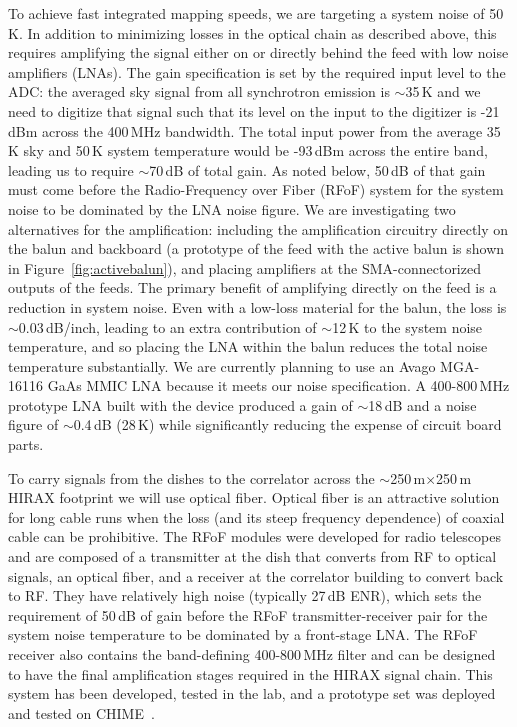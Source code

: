 \documentclass[]{spie}  %
\begin{document}
To achieve fast integrated mapping speeds, we are targeting a system noise of 50\,K. In addition to minimizing losses in the optical chain as described above, this requires amplifying the signal either on or directly behind the feed with low noise amplifiers (LNAs). The gain specification is set by the required input level to the ADC: the averaged sky signal from all synchrotron emission is $\sim$35\,K and we need to digitize that signal such that its level on the input to the digitizer is -21\,dBm across the 400\,MHz bandwidth. The total input power from the average 35\,K sky and 50\,K system temperature would be -93\,dBm across the entire band, leading us to require $\sim$70\,dB of total gain. As noted below, 50\,dB of that gain must come before the Radio-Frequency over Fiber (RFoF) system for the system noise to be dominated by the LNA noise figure. We are investigating two alternatives for the amplification: including the amplification circuitry directly on the balun and backboard (a prototype of the feed with the active balun is shown in Figure~\ref{fig:activebalun}), and placing amplifiers at the SMA-connectorized outputs of the feeds. The primary benefit of amplifying directly on the feed is a reduction in system noise. Even with a low-loss material for the balun, the loss is $\sim$0.03\,dB\//inch, leading to an extra contribution of $\sim$12\,K to the system noise temperature, and so placing the LNA within the balun reduces the total noise temperature substantially. We are currently planning to use an Avago MGA-16116 GaAs MMIC LNA because it meets our noise specification. A 400-800\,MHz prototype LNA built with the device produced a gain of $\sim$18\,dB and a noise figure of $\sim$0.4\,dB (28\,K) while significantly reducing the expense of circuit board parts. \newline


To carry signals from the dishes to the correlator across the $\sim$250\,m$\times$250\,m HIRAX footprint we will use optical fiber. Optical fiber is an attractive solution for long cable runs when the loss (and its steep frequency dependence) of coaxial cable can be prohibitive. The RFoF modules were developed for radio telescopes and are composed of a transmitter at the dish that converts from RF to optical signals, an optical fiber, and a receiver at the correlator building to convert back to RF. They have relatively high noise (typically 27\,dB ENR), which sets the requirement of 50\,dB of gain before the RFoF transmitter-receiver pair for the system noise temperature to be dominated by a front-stage LNA. The RFoF receiver also contains the band-defining 400-800\,MHz filter and can be designed to have the final amplification stages required in the HIRAX signal chain. This system has been developed, tested in the lab, and a prototype set was deployed and tested on CHIME~\cite{2013JInst...810003M}. \newline      
\end{document}
